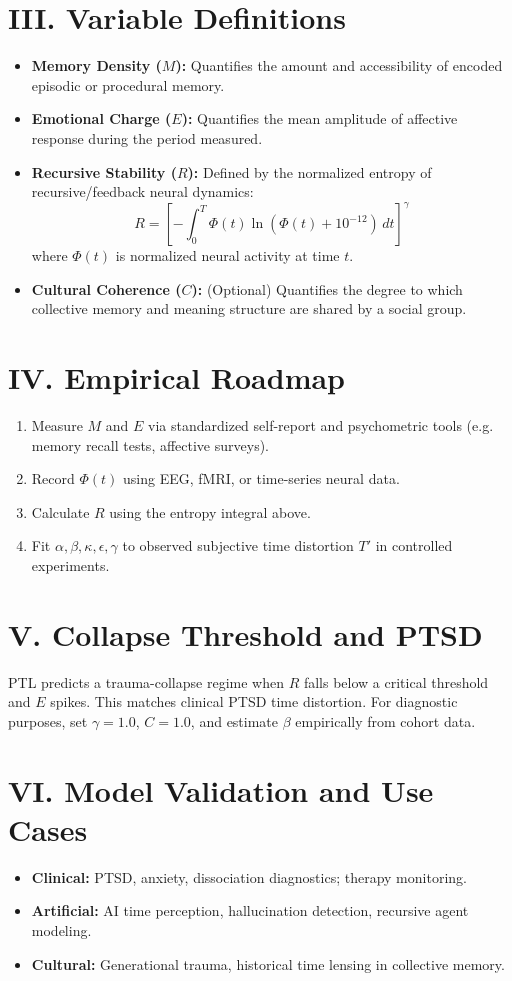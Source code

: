 \documentclass[12pt]{article}
\begin{document}
\section*{III. Variable Definitions}
\begin{itemize}
    \item \textbf{Memory Density ($M$):} Quantifies the amount and accessibility of encoded episodic or procedural memory.
    \item \textbf{Emotional Charge ($E$):} Quantifies the mean amplitude of affective response during the period measured.
    \item \textbf{Recursive Stability ($R$):} Defined by the normalized entropy of recursive/feedback neural dynamics:
    \[
    R = \left[-\int_0^T \Phi(t) \ln(\Phi(t) + 10^{-12})\,dt\right]^\gamma
    \]
    where $\Phi(t)$ is normalized neural activity at time $t$.
    \item \textbf{Cultural Coherence ($C$):} (Optional) Quantifies the degree to which collective memory and meaning structure are shared by a social group.
\end{itemize}

\section*{IV. Empirical Roadmap}
\begin{enumerate}
    \item Measure $M$ and $E$ via standardized self-report and psychometric tools (e.g. memory recall tests, affective surveys).
    \item Record $\Phi(t)$ using EEG, fMRI, or time-series neural data.
    \item Calculate $R$ using the entropy integral above.
    \item Fit $\alpha, \beta, \kappa, \epsilon, \gamma$ to observed subjective time distortion $T'$ in controlled experiments.
\end{enumerate}

\section*{V. Collapse Threshold and PTSD}
PTL predicts a trauma-collapse regime when $R$ falls below a critical threshold and $E$ spikes. This matches clinical PTSD time distortion. For diagnostic purposes, set $\gamma=1.0$, $C=1.0$, and estimate $\beta$ empirically from cohort data.

\section*{VI. Model Validation and Use Cases}
\begin{itemize}
    \item \textbf{Clinical:} PTSD, anxiety, dissociation diagnostics; therapy monitoring.
    \item \textbf{Artificial:} AI time perception, hallucination detection, recursive agent modeling.
    \item \textbf{Cultural:} Generational trauma, historical time lensing in collective memory.
\end{itemize}
\end{document}
